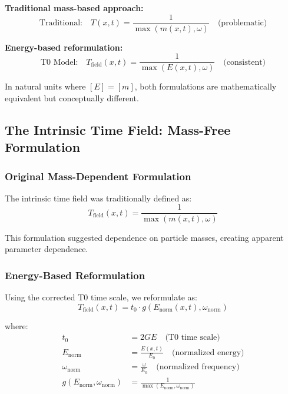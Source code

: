 \documentclass[12pt,a4paper]{report}
\newcommand{\tzero}{t_0}                  %
\begin{document}
\textbf{Traditional mass-based approach:}
\begin{equation}
	\text{Traditional:} \quad T(x,t) = \frac{1}{\max(m(x,t), \omega)} \quad \text{(problematic)}
\end{equation}

\textbf{Energy-based reformulation:}
\begin{equation}
	\text{T0 Model:} \quad T_{\text{field}}(x,t) = \frac{1}{\max(E(x,t), \omega)} \quad \text{(consistent)}
\end{equation}

In natural units where $[E] = [m]$, both formulations are mathematically equivalent but conceptually different.

\subsection{The Intrinsic Time Field: Mass-Free Formulation}
\label{subsec:time_field_elimination}

\subsubsection{Original Mass-Dependent Formulation}

The intrinsic time field was traditionally defined as:
\begin{equation}
	T_{\text{field}}(x,t) = \frac{1}{\max(m(x,t), \omega)}
	\label{eq:time_field_original}
\end{equation}

This formulation suggested dependence on particle masses, creating apparent parameter dependence.

\subsubsection{Energy-Based Reformulation}

Using the corrected T0 time scale, we reformulate as:
\begin{equation}
	\boxed{T_{\text{field}}(x,t) = \tzero \cdot g(E_{\text{norm}}(x,t), \omega_{\text{norm}})}
	\label{eq:time_field_energy_based}
\end{equation}

where:
\begin{align}
	\tzero &= 2GE \quad \text{(T0 time scale)} \\
	E_{\text{norm}} &= \frac{E(x,t)}{E_0} \quad \text{(normalized energy)} \\
	\omega_{\text{norm}} &= \frac{\omega}{E_0} \quad \text{(normalized frequency)} \\
	g(E_{\text{norm}}, \omega_{\text{norm}}) &= \frac{1}{\max(E_{\text{norm}}, \omega_{\text{norm}})}
\end{align}
\end{document}
